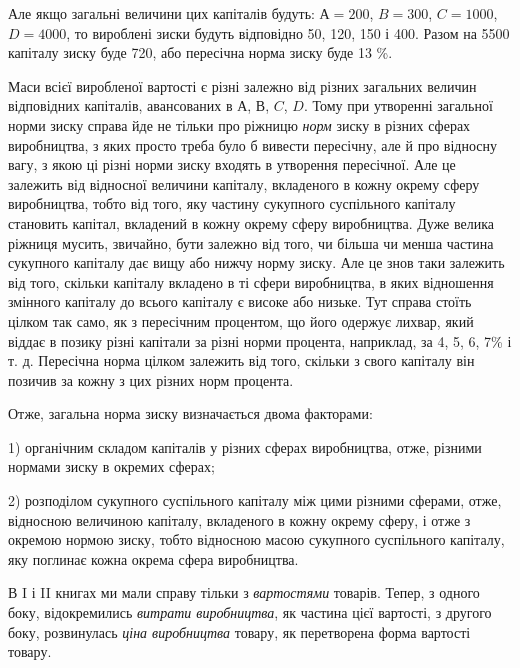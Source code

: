 Але якщо загальні величини цих капіталів будуть: $А = 200$, $B = 300$, $C = 1000$, $D = 4000$, то вироблені
зиски будуть відповідно 50, 120, 150 і 400. Разом на 5500 капіталу зиску буде 720, або пересічна
норма зиску буде 13 \%.

Маси всієї виробленої вартості є різні залежно від різних загальних величин відповідних капіталів,
авансованих в $А$, $В$, $C$, $D$.
Тому при утворенні загальної норми зиску справа йде не тільки
про ріжницю \emph{норм} зиску в різних сферах виробництва, з яких
просто треба було б вивести пересічну, але й про відносну вагу,
з якою ці різні норми зиску входять в утворення пересічної.
Але це залежить від відносної величини капіталу, вкладеного
в кожну окрему сферу виробництва, тобто від того, яку частину
сукупного суспільного капіталу становить капітал, вкладений
в кожну окрему сферу виробництва. Дуже велика ріжниця мусить, звичайно, бути залежно від того, чи
більша чи менша
частина сукупного капіталу дає вищу або нижчу норму зиску.
Але це знов таки залежить від того, скільки капіталу вкладено
в ті сфери виробництва, в яких відношення змінного капіталу
до всього капіталу є високе або низьке. Тут справа стоїть цілком
так само, як з пересічним процентом, що його одержує лихвар,
який віддає в позику різні капітали за різні норми процента, наприклад, за 4, 5, 6, 7\% і т. д.
Пересічна норма цілком залежить
від того, скільки з свого капіталу він позичив за кожну з цих
різних норм процента.

Отже, загальна норма зиску визначається двома факторами:

1) органічним складом капіталів у різних сферах виробництва,
отже, різними нормами зиску в окремих сферах;

2) розподілом сукупного суспільного капіталу між цими різними сферами, отже, відносною величиною
капіталу, вкладеного
в кожну окрему сферу, і отже з окремою нормою зиску, тобто
відносною масою сукупного суспільного капіталу, яку поглинає
кожна окрема сфера виробництва.

В I і II книгах ми мали справу тільки з \emph{вартостями} товарів.
Тепер, з одного боку, відокремились \emph{витрати виробництва}, як
частина цієї вартості, з другого боку, розвинулась \emph{ціна виробництва} товару, як перетворена форма
вартості товару.

